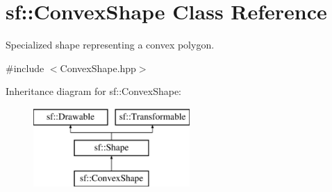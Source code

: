 \hypertarget{classsf_1_1_convex_shape}{}\section{sf\+:\+:Convex\+Shape Class Reference}
\label{classsf_1_1_convex_shape}


Specialized shape representing a convex polygon.  




{\ttfamily \#include $<$Convex\+Shape.\+hpp$>$}

Inheritance diagram for sf\+:\+:Convex\+Shape\+:\begin{figure}[H]
\begin{center}
\leavevmode
\includegraphics[height=3.000000cm]{classsf_1_1_convex_shape}
\end{center}
\end{figure}
